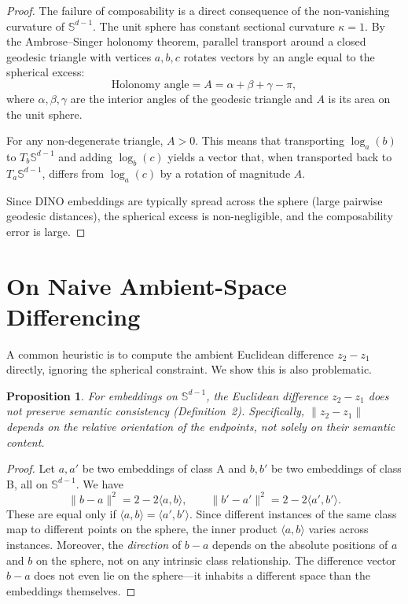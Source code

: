 \documentclass[12pt]{article}
\newtheorem{proposition}{Proposition}
\begin{document}
\begin{proof}
The failure of composability is a direct consequence of the non-vanishing curvature of $\mathbb{S}^{d-1}$. The unit sphere has constant sectional curvature $\kappa = 1$. By the Ambrose--Singer holonomy theorem, parallel transport around a closed geodesic triangle with vertices $a, b, c$ rotates vectors by an angle equal to the spherical excess:
\[
    \text{Holonomy angle} = A = \alpha + \beta + \gamma - \pi,
\]
where $\alpha, \beta, \gamma$ are the interior angles of the geodesic triangle and $A$ is its area on the unit sphere.

For any non-degenerate triangle, $A > 0$. This means that transporting $\log_a(b)$ to $T_b\mathbb{S}^{d-1}$ and adding $\log_b(c)$ yields a vector that, when transported back to $T_a\mathbb{S}^{d-1}$, differs from $\log_a(c)$ by a rotation of magnitude $A$.

Since DINO embeddings are typically spread across the sphere (large pairwise geodesic distances), the spherical excess is non-negligible, and the composability error is large.
\end{proof}

\section{On Naive Ambient-Space Differencing}

A common heuristic is to compute the ambient Euclidean difference $z_2 - z_1$ directly, ignoring the spherical constraint. We show this is also problematic.

\begin{proposition}
For embeddings on $\mathbb{S}^{d-1}$, the Euclidean difference $z_2 - z_1$ does not preserve semantic consistency (Definition~2). Specifically, $\|z_2 - z_1\|$ depends on the relative orientation of the endpoints, not solely on their semantic content.
\end{proposition}

\begin{proof}
Let $a, a'$ be two embeddings of class A and $b, b'$ be two embeddings of class B, all on $\mathbb{S}^{d-1}$. We have
\[
    \|b - a\|^2 = 2 - 2\langle a, b \rangle, \qquad \|b' - a'\|^2 = 2 - 2\langle a', b' \rangle.
\]
These are equal only if $\langle a, b \rangle = \langle a', b' \rangle$. Since different instances of the same class map to different points on the sphere, the inner product $\langle a, b \rangle$ varies across instances. Moreover, the \emph{direction} of $b - a$ depends on the absolute positions of $a$ and $b$ on the sphere, not on any intrinsic class relationship. The difference vector $b - a$ does not even lie on the sphere---it inhabits a different space than the embeddings themselves.
\end{proof}
\end{document}
